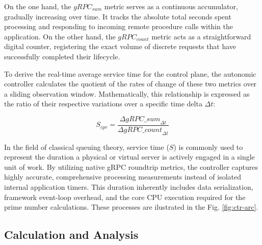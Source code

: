 \documentclass{ieeeaccess}
\begin{document}
On the one hand, the $gRPC_{sum}$ metric serves as a continuous accumulator, gradually increasing over time. It tracks the absolute total seconds spent processing and responding to incoming remote procedure calls within the application. On the other hand, the $gRPC_{count}$ metric acts as a straightforward digital counter, registering the exact volume of discrete requests that have successfully completed their lifecycle. 

To derive the real-time average service time for the control plane, the autonomic controller calculates the quotient of the rates of change of these two metrics over a sliding observation window. Mathematically, this relationship is expressed as the ratio of their respective variations over a specific time delta $\Delta t$:

\begin{equation}
	S_{cpr} = \frac{\Delta \textit{gRPC_{sum}}_{\Delta t}}{\Delta \textit{gRPC_{count}}_{\Delta t}}
\end{equation}

In the field of classical queuing theory, service time ($S$) is commonly used to represent the duration a physical or virtual server is actively engaged in a single unit of work. By utilizing native gRPC roundtrip metrics, the controller captures highly accurate, comprehensive processing measurements instead of isolated internal application timers. This duration inherently includes data serialization, framework event-loop overhead, and the core CPU execution required for the prime number calculations. These processes are ilustrated in the Fig. \ref{fig:ctr-arc}. 



\subsection{Calculation and Analysis}
\label{sec3.2}
\end{document}
